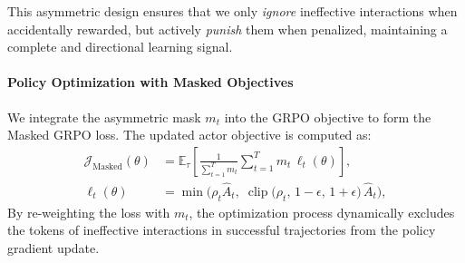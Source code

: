 \documentclass[letterpaper]{article} %
\begin{document}

This asymmetric design ensures that we only \textit{ignore} ineffective interactions when accidentally rewarded, but actively \textit{punish} them when penalized, maintaining a complete and directional learning signal.

\paragraph{Policy Optimization with Masked Objectives}
We integrate the asymmetric mask $m_t$ into the GRPO objective to form the Masked GRPO loss. 
The updated actor objective is computed as:
\begin{equation}
\label{eq:masked_grpo}
    \begin{aligned}
        \mathcal{J}_{\text{Masked}}(\theta) &= \mathbb{E}_{\tau}\!\left[ \frac{1}{\sum_{t=1}^{T} m_t} \sum_{t=1}^{T} m_t \, \ell_t(\theta) \right], \\
        \ell_t(\theta) &= \min\!\Big( \rho_t \hat{A}_t,\; \operatorname{clip}\!\big(\rho_t,\, 1{-}\epsilon,\, 1{+}\epsilon\big)\, \hat{A}_t \Big),
    \end{aligned}
\end{equation}
By re-weighting the loss with $m_t$, the optimization process dynamically excludes the tokens of ineffective interactions in successful trajectories from the policy gradient update. 
\end{document}
